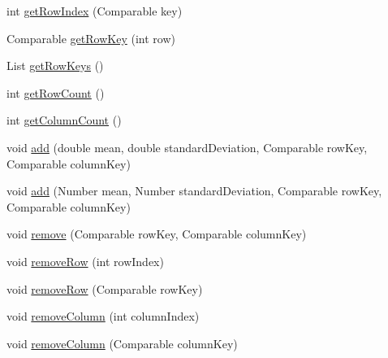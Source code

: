 \begin{DoxyCompactItemize}
int \mbox{\hyperlink{classorg_1_1jfree_1_1data_1_1statistics_1_1_default_statistical_category_dataset_ad9d326f8427acc2ccda08946308fa12f}{get\+Row\+Index}} (Comparable key)
\item 
Comparable \mbox{\hyperlink{classorg_1_1jfree_1_1data_1_1statistics_1_1_default_statistical_category_dataset_a3d1639e32ea6605c35735de8e89486f8}{get\+Row\+Key}} (int row)
\item 
List \mbox{\hyperlink{classorg_1_1jfree_1_1data_1_1statistics_1_1_default_statistical_category_dataset_abd2788a3ec62a9b685a1ef9dd75fa787}{get\+Row\+Keys}} ()
\item 
int \mbox{\hyperlink{classorg_1_1jfree_1_1data_1_1statistics_1_1_default_statistical_category_dataset_ae1ca17a2e7625045f1fd159054566ca8}{get\+Row\+Count}} ()
\item 
int \mbox{\hyperlink{classorg_1_1jfree_1_1data_1_1statistics_1_1_default_statistical_category_dataset_a7902055e97297ac0e6a62506cbce677e}{get\+Column\+Count}} ()
\item 
void \mbox{\hyperlink{classorg_1_1jfree_1_1data_1_1statistics_1_1_default_statistical_category_dataset_a85a6a03116003a566a7b85bb2f6ec644}{add}} (double mean, double standard\+Deviation, Comparable row\+Key, Comparable column\+Key)
\item 
void \mbox{\hyperlink{classorg_1_1jfree_1_1data_1_1statistics_1_1_default_statistical_category_dataset_a1366308de400cc5bad60e6472c24c4de}{add}} (Number mean, Number standard\+Deviation, Comparable row\+Key, Comparable column\+Key)
\item 
void \mbox{\hyperlink{classorg_1_1jfree_1_1data_1_1statistics_1_1_default_statistical_category_dataset_a11ab7664991678352e203f8fd57a55d4}{remove}} (Comparable row\+Key, Comparable column\+Key)
\item 
void \mbox{\hyperlink{classorg_1_1jfree_1_1data_1_1statistics_1_1_default_statistical_category_dataset_ab5739fe0b41281d22ec2f4d294379cbb}{remove\+Row}} (int row\+Index)
\item 
void \mbox{\hyperlink{classorg_1_1jfree_1_1data_1_1statistics_1_1_default_statistical_category_dataset_a679a64d7b03d1530ebc792cb8aa01f7e}{remove\+Row}} (Comparable row\+Key)
\item 
void \mbox{\hyperlink{classorg_1_1jfree_1_1data_1_1statistics_1_1_default_statistical_category_dataset_a1981755d8867127679bf11f59a7c62d4}{remove\+Column}} (int column\+Index)
\item 
void \mbox{\hyperlink{classorg_1_1jfree_1_1data_1_1statistics_1_1_default_statistical_category_dataset_a9677e48208461d7ad22a1d87eb93e6ee}{remove\+Column}} (Comparable column\+Key)

\end{DoxyCompactItemize}
